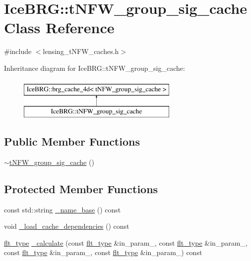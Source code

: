 \hypertarget{classIceBRG_1_1tNFW__group__sig__cache}{\section{Ice\-B\-R\-G\-:\-:t\-N\-F\-W\-\_\-group\-\_\-sig\-\_\-cache Class Reference}
\label{classIceBRG_1_1tNFW__group__sig__cache}
}


{\ttfamily \#include $<$lensing\-\_\-t\-N\-F\-W\-\_\-caches.\-h$>$}

Inheritance diagram for Ice\-B\-R\-G\-:\-:t\-N\-F\-W\-\_\-group\-\_\-sig\-\_\-cache\-:\begin{figure}[H]
\begin{center}
\leavevmode
\includegraphics[height=2.000000cm]{classIceBRG_1_1tNFW__group__sig__cache}
\end{center}
\end{figure}
\subsection*{Public Member Functions}
\begin{DoxyCompactItemize}
\item 
\hyperlink{classIceBRG_1_1tNFW__group__sig__cache_a6a4dd7e7ab2356a0e74bccc6a03d46f1}{$\sim$t\-N\-F\-W\-\_\-group\-\_\-sig\-\_\-cache} ()
\end{DoxyCompactItemize}
\subsection*{Protected Member Functions}
\begin{DoxyCompactItemize}
\item 
const std\-::string \hyperlink{classIceBRG_1_1tNFW__group__sig__cache_af13fbfb83bf04be0e895ca3bd8f215a9}{\-\_\-name\-\_\-base} () const 
\item 
void \hyperlink{classIceBRG_1_1tNFW__group__sig__cache_a000f3c95c988adeedadb8f2acd32c950}{\-\_\-load\-\_\-cache\-\_\-dependencies} () const 
\item 
\hyperlink{lib_2IceBRG__main_2common_8h_ad0f130a56eeb944d9ef2692ee881ecc4}{flt\-\_\-type} \hyperlink{classIceBRG_1_1tNFW__group__sig__cache_ae679ace3d05bf7bbb8d8ef9ca74a67b3}{\-\_\-calculate} (const \hyperlink{lib_2IceBRG__main_2common_8h_ad0f130a56eeb944d9ef2692ee881ecc4}{flt\-\_\-type} \&in\-\_\-param\-\_, const \hyperlink{lib_2IceBRG__main_2common_8h_ad0f130a56eeb944d9ef2692ee881ecc4}{flt\-\_\-type} \&in\-\_\-param\-\_, const \hyperlink{lib_2IceBRG__main_2common_8h_ad0f130a56eeb944d9ef2692ee881ecc4}{flt\-\_\-type} \&in\-\_\-param\-\_, const \hyperlink{lib_2IceBRG__main_2common_8h_ad0f130a56eeb944d9ef2692ee881ecc4}{flt\-\_\-type} \&in\-\_\-param\-\_) const 
\end{DoxyCompactItemize}
